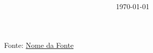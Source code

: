 \documentclass[10pt]{book}
\title{
	\vspace*{-5mm}
	\resizebox{60mm}{12mm}{\textcolor{black}{ABC}}
	\\
	\resizebox{60mm}{6mm}{\textcolor{black}{\textbf{da Inform\'{a}tica}}}
	\\
	\resizebox{80mm}{5mm}{\textcolor{black}{Aulas Expositivas}}
}
\author{
	\resizebox{60mm}{4mm}{\textcolor{black} Alexandre Aravecchia}
}
\date{\small \today}
\begin{document}
	
	\maketitle
	
	\begin{multicols}{2}
		\tableofcontents
	\end{multicols}
	
	{\normalsize Fonte: \href{URL_DA_FONTE}{Nome da Fonte}}
	
	
	
	
	
\end{document}
